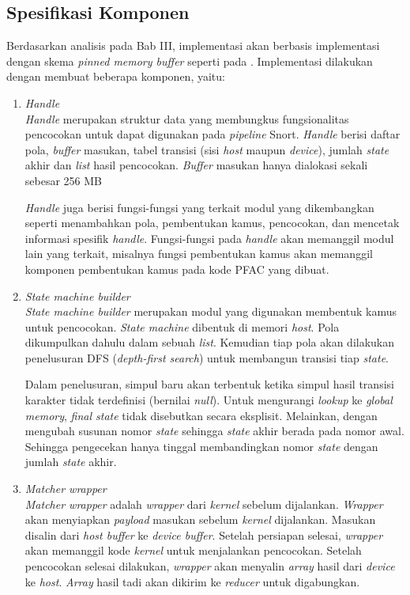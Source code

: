   \subsection{Spesifikasi Komponen}

    Berdasarkan analisis pada Bab III, implementasi akan berbasis implementasi \cite{lin2013} dengan skema \emph{pinned memory buffer} seperti pada \cite{gnort2008}. Implementasi dilakukan dengan membuat beberapa komponen, yaitu:

    \begin{enumerate}

      \item
      \emph{Handle} \\
      \emph{Handle} merupakan struktur data yang membungkus fungsionalitas pencocokan untuk dapat digunakan pada \emph{pipeline} Snort. \emph{Handle} berisi daftar pola, \emph{buffer} masukan, tabel transisi (sisi \emph{host} maupun \emph{device}), jumlah \emph{state} akhir dan \emph{list} hasil pencocokan. \emph{Buffer} masukan hanya dialokasi sekali sebesar 256 MB
      
      \emph{Handle} juga berisi fungsi-fungsi yang terkait modul yang dikembangkan seperti menambahkan pola, pembentukan kamus, pencocokan, dan mencetak informasi spesifik \emph{handle}. Fungsi-fungsi pada \emph{handle} akan memanggil modul lain yang terkait, misalnya fungsi pembentukan kamus akan memanggil komponen pembentukan kamus pada kode PFAC yang dibuat.      

      \item
      \emph{State machine builder} \\
      \emph{State machine builder} merupakan modul yang digunakan membentuk kamus untuk pencocokan. \emph{State machine} dibentuk di memori \emph{host}. Pola dikumpulkan dahulu dalam sebuah \emph{list}. Kemudian tiap pola akan dilakukan penelusuran DFS (\emph{depth-first search}) untuk membangun transisi tiap \emph{state}. 
      
      Dalam penelusuran, simpul baru akan terbentuk ketika simpul hasil transisi karakter tidak terdefinisi (bernilai \emph{null}). Untuk mengurangi \emph{lookup} ke \emph{global memory}, \emph{final state} tidak disebutkan secara eksplisit. Melainkan, dengan mengubah susunan nomor \emph{state} sehingga \emph{state} akhir berada pada nomor awal. Sehingga pengecekan hanya tinggal membandingkan nomor \emph{state} dengan jumlah \emph{state} akhir.

      \item
      \emph{Matcher wrapper} \\
      \emph{Matcher wrapper} adalah \emph{wrapper} dari \emph{kernel} sebelum dijalankan. \emph{Wrapper} akan menyiapkan \emph{payload} masukan sebelum \emph{kernel} dijalankan. Masukan disalin dari \emph{host buffer} ke \emph{device buffer}. Setelah persiapan selesai, \emph{wrapper} akan memanggil kode \emph{kernel} untuk menjalankan pencocokan. Setelah pencocokan selesai dilakukan, \emph{wrapper} akan menyalin \emph{array} hasil dari \emph{device} ke \emph{host}. \emph{Array} hasil tadi akan dikirim ke \emph{reducer} untuk digabungkan.


\end{enumerate}
